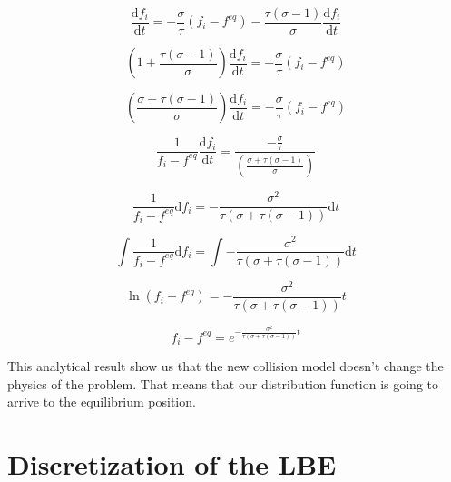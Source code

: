 \documentclass{article}
\begin{document}
\begin{equation}
    \frac{\mathrm{d} f_{i}}{\mathrm{d} t}= -\frac{\sigma}{\tau}(f_i-f^{eq}) - \frac{\tau(\sigma-1)}{\sigma}\frac{\mathrm{d}f_{i}}{\mathrm{d}t}
\end{equation}

\begin{equation*}
    \left(1 + \frac{\tau(\sigma-1)}{\sigma}\right)\frac{\mathrm{d} f_{i}}{\mathrm{d} t}= -\frac{\sigma}{\tau}(f_i-f^{eq}) 
\end{equation*}

\begin{equation*}
    \left(\frac{\sigma + \tau(\sigma-1)}{\sigma}\right)\frac{\mathrm{d} f_{i}}{\mathrm{d} t}= -\frac{\sigma}{\tau}(f_i-f^{eq}) 
\end{equation*}

\begin{equation*}
    \frac{1}{f_i-f^{eq}}\frac{\mathrm{d} f_{i}}{\mathrm{d} t}= \frac{-\frac{\sigma}{\tau}}{\left(\frac{\sigma + \tau(\sigma-1)}{\sigma}\right)} 
\end{equation*}

\begin{equation*}
    \frac{1}{f_i-f^{eq}}\mathrm{d} f_{i}= -\frac{\sigma^2}{\tau(\sigma + \tau(\sigma-1))}\mathrm{d} t 
\end{equation*}

\begin{equation*}
    \int\frac{1}{f_i-f^{eq}}\mathrm{d} f_{i}= \int-\frac{\sigma^2}{\tau(\sigma + \tau(\sigma-1))}\mathrm{d} t 
\end{equation*}

\begin{equation*}
    \ln{(f_i-f^{eq})}= -\frac{\sigma^2}{\tau(\sigma + \tau(\sigma-1))} t 
\end{equation*}

\begin{equation*}
    f_i-f^{eq}= e^{{-\frac{\sigma^2}{\tau(\sigma + \tau(\sigma-1))} t}} 
\end{equation*}

This analytical result show us that the new collision model doesn't change the physics of the problem.
That means that our distribution function is going to arrive to the equilibrium position.

\section{Discretization of the LBE}
\end{document}
